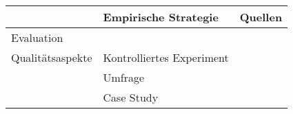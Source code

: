 \begin{table}[hbt!]
    \begin{center}
        \begin{tabular}{p{}p{}p{}}
            \hline
             & Empirische Strategie & Quellen \\
             \toprule
             Evaluation &  & \\
            Qualitätsaspekte                                                                &
            Kontrolliertes Experiment                                                       &
                 \cite{tintarev_designing_nodate} \cite{sato_context_nodate} \cite{eiband_impact_2019} \cite{tsai_evaluating_2019} \cite{hernandez-bocanegra_effects_2020} \cite{balog_measuring_2020} \cite{kunkel_let_2019} \cite{schaffer_i_2019} \cite{weitz_you_2019} \cite{yamada_evaluating_2016} \cite{sato_action-triggering_2019} \cite{haspiel_explanations_2018} \cite{zahedi_towards_2019} \cite{zolotas_towards_2019} \cite{riveiro_thats_2021}  \cite{martin_evaluating_2021} \cite{tsai_effects_2020}    \cite{neerincx_using_2018} \cite{schrills_color_2020} \cite{wang_is_2018} \cite{zhu_effects_2020} \cite{koo_why_2015} \cite{koo_understanding_2016} \cite{cheng2019explaining}
                 \\
                &
                Umfrage                                                                         &
                \cite{chazette_end-users_nodate} \cite{chazette2020explainability} \cite{sokol_one_2020}
                \\
                & Case Study                                                                      &
                 \cite{martin_developing_2019} \cite{ehsan_human-centered_2020}
                 \\
            

\end{tabular}
\end{center}
\end{table}
